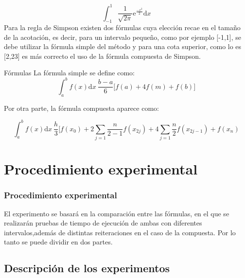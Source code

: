 \documentclass{beamer}
\begin{document}
\begin{frame}
\begin{block}{}

\[\int_{-1}^{1} \frac{1}{\sqrt{2\pi}}\text{e}^{\frac{-x^2}{2}} \text{d}x\] 
Para la regla de Simpson existen dos fórmulas cuya elección recae en el tamaño de la acotación, es decir, para un intervalo pequeño, como por ejemplo [-1,1],
se debe utilizar la fórmula simple del método y para una cota superior, como lo es [2,23] es más correcto el uso de la fórmula compuesta de Simpson.
\end{block}

\end{frame}
\begin{frame}
\begin{block}{Fórmulas}
La fórmula simple se define como:
\[\int_{a}^{b} f(x)\text{d}x ~ \frac{b-a}{6}\big[f(a)+4f(m)+f(b)\big]\]\par
 
Por otra parte, la fórmula compuesta aparece como:

\[\int_{a}^{b} f(x)\text{d}x ~ \frac{h}{3}\big[f(x_0)+2\sum_{j=1}{\frac{n}{2-1}} f(x_{2j})+4 \sum_{j=1}{\frac{n}{2}}f(x_{2j-1})+f(x_n)\]

\end{block}

\end{frame}

\section{Procedimiento experimental}

\begin{frame}
\frametitle{Procedimiento experimental}
\begin{block}{}
El experimento se basará en la comparación entre las fórmulas, en el que se realizarán pruebas de tiempo de ejecución de ambas con 
diferentes intervalos,además de distintas reiteraciones en el caso de la compuesta.
Por lo tanto se puede dividir en dos partes.

\end{block}
\end{frame}

\subsection{Descripción de los experimentos}
\end{document}
